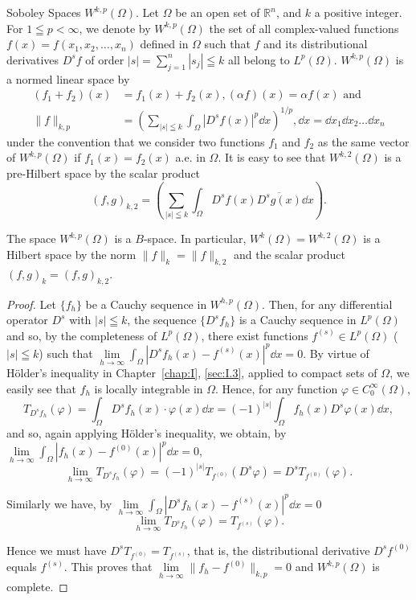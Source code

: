 Soboley Spaces $W^{k,p}(\Omega)$. Let $\Omega$ be an open set of $\mathbb{R}^{n}$, and $k$ a positive integer. For $1 \leqq p< \infty$, we denote by $W^{k,p}(\Omega)$ the set of all complex-valued functions $f(x) = f(x_1, x_2, \ldots, x_n)$ defined in $\Omega$ such that $f$ and its distributional derivatives $D^s f$ of order $|s| = \sum\limits_{j=1}^{n} |s_j| \leqq k$ all belong to $L^p(\Omega)$. $W^{k,p}(\Omega)$ is a normed linear space by 
\[
\begin{aligned} (f_{1} + f_{2}) (x) & = f_{1} (x) + f_{2} (x), (\alpha f) (x) = \alpha f (x) \text{ and } \\ \| f \|_{k,p} & = \left(\sum\limits_{| s | \leqq k} \int_{\Omega} | D ^{s} f (x) | ^{p} \dd x\right) ^{1/p}, \dd x = \dd x_{1} \dd x_{2} \dots \dd x_{n} \end{aligned}
\]
under the convention that we consider two functions $f_{1}$ and $f_{2}$ as the same vector of $W^{k,p}(\Omega)$ if $f_{1}(x) = f_{2}(x)$ a.e. in $\Omega$. It is easy to see that $W^{k,2}(\Omega)$ is a pre-Hilbert space by the scalar product 
\[
(f, g)_{k,2} = \left(\sum\limits_{| s | \leqq k} \int_{\Omega} D ^{s} f (x) \overline {{D ^{s} g (x)}} \dd x\right).
\]

\begin{proposition}\label{prop:I.9.Proposition.5} The space $W^{k,p}(\Omega)$ is a $B$-space. In particular, $W^k (\Omega) = W^{k,2}(\Omega)$ is a Hilbert space by the norm $\|f\|_k = \|f\|_{k,2}$ and the scalar product $(f,g)_k = (f,g)_{k,2}$. 
\end{proposition}

\begin{proof}
 Let $\{f_h\}$ be a Cauchy sequence in $W^{h,p}(\Omega)$. Then, for any differential operator $D^s$ with $|s|\leqq k$, the sequence $\{D^s f_h\}$ is a Cauchy sequence in $L^p(\Omega)$ and so, by the completeness of $L^p(\Omega)$, there exist functions $f^{(s)}\in L^{p}(\Omega)$ ( $|s|\leqq k$) such that $\lim\limits_{h\to \infty}\int_{\Omega}|D^{s}f_{h}(x)- f^{(s)}(x)|^{p}\dd x = 0$. By virtue of Hölder's inequality in Chapter~\ref{chap:I}, \ref{sec:I.3}, applied to compact sets of $\Omega$, we easily see that $f_{h}$ is locally integrable in $\Omega$. Hence, for any function $\varphi \in C_0^\infty (\Omega)$, 
\[
T_ {D ^{s} f_{h}} (\varphi) = \int_{\Omega} D ^{s} f_{h} (x) \cdot \varphi (x) \dd x = (- 1) ^{|s|} \int_{\Omega} f_{h} (x) D ^{s} \varphi (x) \dd x,
\]
and so, again applying Hölder's inequality, we obtain, by $\lim\limits_{h\to \infty}\int_{\Omega}|f_h(x)- f^{(0)}(x)|^p\dd x = 0,$ 
\[
\lim\limits_{h \rightarrow \infty} T_ {D ^{s} f_{h}} (\varphi) = (- 1) ^{|s|} T_ {f ^{(0)}} (D ^{s} \varphi) = D ^{s} T_ {f ^{(0)}} (\varphi). \]

Similarly we have, by $\lim\limits_{h\to \infty}\int_{\Omega}|D^{s}f_{h}(x)- f^{(s)}(x)|^{p}\dd x = 0$ 
\[
\lim\limits_{h \rightarrow \infty} T_ {D ^{s} f_{h}} (\varphi) = T_ {f ^{(s)}} (\varphi).
\]

Hence we must have $D^{s}T_{f^{(0)}} = T_{f^{(s)}}$, that is, the distributional derivative $D^{s}f^{(0)}$ equals $f^{(s)}$. This proves that $\lim\limits_{h\to \infty}\| f_h- f^{(0)}\|_{k,p} = 0$ and $W^{k,p}(\Omega)$ is complete. 
\end{proof}


